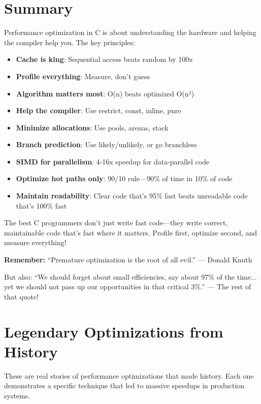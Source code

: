\section{Summary}

Performance optimization in C is about understanding the hardware and helping the compiler help you. The key principles:

\begin{itemize}
    \item \textbf{Cache is king}: Sequential access beats random by 100x
    \item \textbf{Profile everything}: Measure, don't guess
    \item \textbf{Algorithm matters most}: O(n) beats optimized O(n²)
    \item \textbf{Help the compiler}: Use restrict, const, inline, pure
    \item \textbf{Minimize allocations}: Use pools, arenas, stack
    \item \textbf{Branch prediction}: Use likely/unlikely, or go branchless
    \item \textbf{SIMD for parallelism}: 4-16x speedup for data-parallel code
    \item \textbf{Optimize hot paths only}: 90/10 rule—90\% of time in 10\% of code
    \item \textbf{Maintain readability}: Clear code that's 95\% fast beats unreadable code that's 100\% fast
\end{itemize}

The best C programmers don't just write fast code—they write correct, maintainable code that's fast where it matters. Profile first, optimize second, and measure everything!

\begin{tipbox}
\textbf{Remember:} ``Premature optimization is the root of all evil.'' — Donald Knuth

But also: ``We should forget about small efficiencies, say about 97\% of the time... yet we should not pass up our opportunities in that critical 3\%.'' — The rest of that quote!
\end{tipbox}

\section{Legendary Optimizations from History}

These are real stories of performance optimizations that made history. Each one demonstrates a specific technique that led to massive speedups in production systems.

